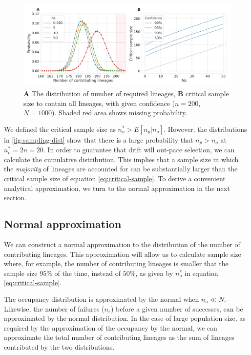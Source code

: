 \documentclass[review]{elsarticle}
\begin{document}
\begin{figure}
  \centering
  \includegraphics[width=\textwidth]{fig/combined.pdf}
  \caption{\textbf{A} The distribution of number of required lineages, \textbf{B} critical sample
    size to contain all lineages, with given confidence ($n=200$, $N=1000$). Shaded red area shows
    missing probability.}
  \label{fig:combined}
\end{figure}

We defined the critical sample size as $n_o^* > E[n_p | n_o]$. However, the distributions in
\ref{fig:sampling-dist} show that there is a large probability that $n_p>n_o$ at $n_o^*=2n=20$. In
order to guarantee that drift will out-pace selection, we can calculate the cumulative distribution.
This implies that a sample size in which the \textit{majority} of lineages are accounted for can be
substantially larger than the critical sample size of equation \eqref{eq:critical-sample}. To derive
a convenient analytical approximation, we turn to the normal approximation in the next section.

\subsection{Normal approximation}

We can construct a normal approximation to the distribution of the number of contributing lineages.
This approximation will allow us to calculate sample size where, for example, the number of
contributing lineages is smaller that the sample size $95\%$ of the time, instead of $50\%$, as
given by $n_o^*$ in equation \eqref{eq:critical-sample}.

The occupancy distribution is approximated by the normal \citep{ONeill2019} when $n_o \ll N$.
Likewise, the number of failures ($n_r$) before a given number of successes, can be approximated by
the normal distribution. In the case of large population size, as required by the approximation of
the occupancy by the normal, we can approximate the total number of contributing lineages as the sum
of lineages contributed by the two distributions.
\end{document}
